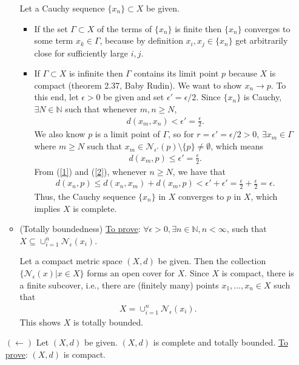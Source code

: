 \documentclass[11pt]{article}
\begin{document}
\begin{enumerate}
\begin{itemize}
		Let a Cauchy sequence $\{x_n\} \subset X$ be given. 
		\begin{itemize}
			\item If the set $\Gamma \subset X$ of the terms of $\{x_n\}$ is finite then $\{x_n\}$ converges to some term $x_k\in\Gamma$, because by definition $x_i,x_j \in \{x_n\}$ get arbitrarily close for sufficiently large $i,j$. 
			\item If $\Gamma \subset X$ is infinite then $\Gamma$ contains its limit point $p$ because $X$ is compact (theorem 2.37, Baby Rudin). We want to show $x_n \to p$. To this end, let $\epsilon > 0$ be given and set $\epsilon' = \epsilon/2$. Since $\{x_n\}$ is Cauchy, $\exists N \in \mathbb{N}$ such that whenever $m,n \geq N$, 
			\begin{align}\label{1}
			d(x_m,x_n) < \epsilon' = \frac{\epsilon}{2}.
			\end{align}
			We also know $p$ is a limit point of $\Gamma$, so for $r = \epsilon' = \epsilon/2 > 0$, $\exists x_m \in \Gamma$ where $m \geq N$ such that $x_m \in \mathcal{N}_{\epsilon'}(p)\setminus\{p\} \neq \emptyset$, which means
			\begin{align}\label{2}
			d(x_m,p) \leq \epsilon' = \frac{\epsilon}{2}.
			\end{align}
			From (\ref{1}) and (\ref{2}), whenever $n \geq N$, we have that
			\begin{align*}
			d(x_n,p) \leq d(x_n,x_m) + d(x_m,p) < \epsilon' + \epsilon' = \frac{\epsilon}{2} + \frac{\epsilon}{2} = \epsilon.
			\end{align*}
			Thus, the Cauchy sequence $\{x_n\}$ in $X$ converges to $p$ in $X$, which implies $X$ is complete.  
		\end{itemize}
		\item (Totally boundedness) \underline{To prove}: $\forall \epsilon > 0, \exists n \in \mathbb{N}, n < \infty$, such that $X \subseteq \cup^{n}_{i=1}\mathcal{N}_\epsilon(x_i)$.  
		
		Let a compact metric space $(X,d)$ be given. Then the collection $\{\mathcal{N}_\epsilon(x) | x\in X\}$ forms an open cover for $X$. Since $X$ is compact, there is a finite subcover, i.e., there are (finitely many) points $x_1,\dots,x_n \in X$ such that 
		\begin{align*} 
		X = \cup^n_{i=1} \mathcal{N}_\epsilon(x_i).
		\end{align*}
		This shows $X$ is totally bounded. 
	\end{itemize}
	
	$(\leftarrow)$ Let $(X,d)$ be given. $(X,d)$ is complete and totally bounded. \underline{To prove}: $(X,d)$ is compact. 
	

\end{enumerate}
\end{document}

